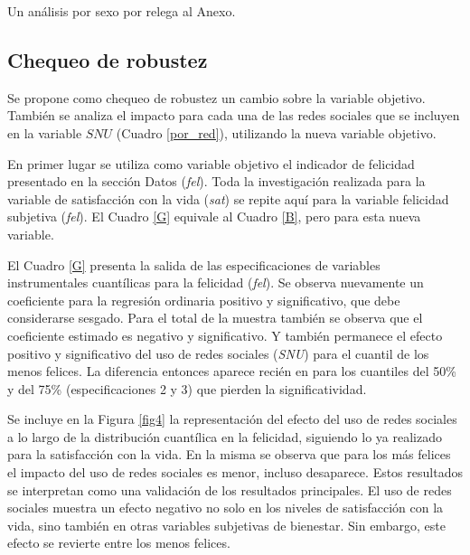 \documentclass[11pt]{article}
\begin{document}
Un análisis por sexo por relega al Anexo. 

\subsection{Chequeo de robustez}
Se propone como chequeo de robustez un cambio sobre la variable objetivo. También se analiza el impacto para cada una de las redes sociales que se incluyen en la variable $SNU$ (Cuadro \ref{por_red}), utilizando la nueva variable objetivo. 

En primer lugar se utiliza como variable objetivo el indicador de felicidad presentado en la sección Datos (\textit{fel}). Toda la investigación realizada para la variable de satisfacción con la vida (\textit{sat}) se repite aquí para la variable felicidad subjetiva (\textit{fel}). El Cuadro \ref{G} equivale al Cuadro \ref{B}, pero para esta nueva variable.

\begin{table}[htbp]
    \centering
    \caption{Felicidad}
 
\label{G}
\end{table}

El Cuadro \ref{G} presenta la salida de las especificaciones de variables instrumentales cuantílicas para la felicidad (\textit{fel}). Se observa nuevamente un coeficiente para la regresión ordinaria positivo y significativo, que debe considerarse sesgado. Para el total de la muestra también se observa que el coeficiente estimado es negativo y significativo. Y también permanece el efecto positivo y significativo del uso de redes sociales (\textit{SNU}) para el cuantil de los menos felices. La diferencia entonces aparece recién en para los cuantiles del 50\% y del 75\% (especificaciones 2 y 3) que pierden la significatividad. 

Se incluye en la Figura \ref{fig4} la representación del efecto del uso de redes sociales a lo largo de la distribución cuantílica en la felicidad, siguiendo lo ya realizado para la satisfacción con la vida. En la misma se observa que para los más felices el impacto del uso de redes sociales es menor, incluso desaparece. Estos resultados se interpretan como una validación de los resultados principales. El uso de redes sociales muestra un efecto negativo no solo en los niveles de satisfacción con la vida, sino también en otras variables subjetivas de bienestar. Sin embargo, este efecto se revierte entre los menos felices. 
\end{document}
